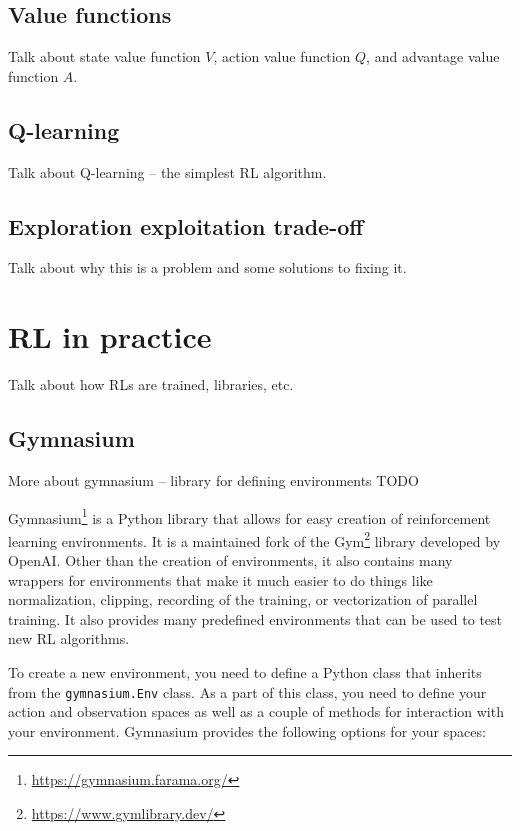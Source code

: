 \documentclass[
  digital,     %
  oneside,     %
  nosansbold,  %
  nocolorbold, %
  lof,         %
  lot,         %
]{fithesis4}
\begin{document}
\section{Value functions}
Talk about state value function $V$, action value function $Q$, and advantage value function $A$.

\section{Q-learning}
Talk about Q-learning -- the simplest RL algorithm.

\section{Exploration exploitation trade-off}
Talk about why this is a problem and some solutions to fixing it.

\chapter{RL in practice}
Talk about how RLs are trained, libraries, etc.

\section{Gymnasium}
\label{section:gym}
More about gymnasium -- library for defining environments TODO

Gymnasium\footnote{\url{https://gymnasium.farama.org/}} is a Python library that allows for easy creation of reinforcement learning environments. It is a maintained fork of the Gym\footnote{\url{https://www.gymlibrary.dev/}} library developed by OpenAI. Other than the creation of environments, it also contains many wrappers for environments that make it much easier to do things like normalization, clipping, recording of the training, or vectorization of parallel training. It also provides many predefined environments that can be used to test new RL algorithms.

To create a new environment, you need to define a Python class that inherits from the \verb|gymnasium.Env| class. As a part of this class, you need to define your action and observation spaces as well as a couple of methods for interaction with your environment. Gymnasium provides the following options for your spaces:
\end{document}
